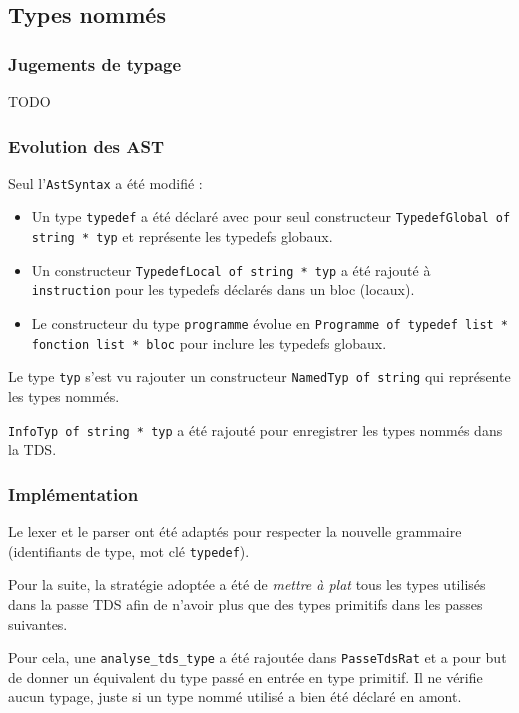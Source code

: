\documentclass[headings=standardclasses,parskip=half]{scrartcl}
\begin{document}
\subsection{Types nommés}

\subsubsection*{Jugements de typage}

TODO

\subsubsection*{Evolution des AST}

Seul l'\texttt{AstSyntax} a été modifié :

\begin{itemize}
    \item Un type \texttt{typedef} a été déclaré avec pour seul
          constructeur \texttt{TypedefGlobal of string * typ} et
          représente les typedefs globaux.
    \item Un constructeur \texttt{TypedefLocal of string * typ} a
          été rajouté à \texttt{instruction} pour les typedefs
          déclarés dans un bloc (locaux).
    \item Le constructeur du type \texttt{programme} évolue en
          \texttt{Programme of typedef list * fonction list * bloc}
          pour inclure les typedefs globaux.
\end{itemize}

Le type \texttt{typ} s'est vu rajouter un constructeur
\texttt{NamedTyp of string} qui représente les types nommés.

\texttt{InfoTyp of string * typ} a été rajouté pour enregistrer
les types nommés dans la TDS.

\subsubsection*{Implémentation}

Le lexer et le parser ont été adaptés pour respecter la nouvelle
grammaire (identifiants de type, mot clé \texttt{typedef}).

Pour la suite, la stratégie adoptée a été de \textit{mettre à plat}
tous les types utilisés dans la passe TDS afin de n'avoir plus que
des types primitifs dans les passes suivantes.

Pour cela, une \texttt{analyse\_tds\_type} a été rajoutée dans
\texttt{PasseTdsRat} et a pour but de donner un équivalent du type
passé en entrée en type primitif.
Il ne vérifie aucun typage, juste si un type nommé utilisé a bien été
déclaré en amont.
\end{document}
